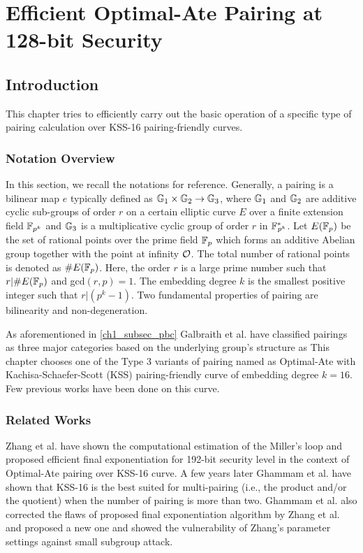 \chapter{Efficient Optimal-Ate Pairing at 128-bit Security} 
\label{ch:indocrypt}
\section{Introduction}
This chapter tries to efficiently carry out the basic operation of a specific type of pairing calculation over KSS-16 pairing-friendly curves. 

\subsection{Notation Overview}
In this section, we recall the notations for reference.
Generally, a pairing is a bilinear map $e$ typically defined as  ${\mathbb{G}}_{1} \times {\mathbb{G}}_{2} \to {\mathbb{G}}_{3}$, where ${\mathbb{G}}_{1}$ and ${\mathbb{G}}_{2}$ are additive cyclic sub-groups of  order $r$  on a certain elliptic curve $E$ over a finite extension field $\mathbb{F}_{p^k}$ and ${\mathbb{G}}_{3}$ is a multiplicative cyclic group of order $r$ in ${{\mathbb{F}}^{\ast}}_{\!\!\!p^{k}}$.
Let $E({\mathbb{F}}_{p})$ be the set of rational points over the prime field ${\mathbb{F}}_{p}$ which forms an additive Abelian group together with the point at infinity $\cal{O}$. The total number of rational points is denoted as $\#E({\mathbb{F}}_{p})$. Here, the order $r$ is a large prime number such that $r | \#E({\mathbb{F}}_{p})$ and gcd$(r,p)=1$. The embedding degree $k$ is the smallest positive integer such that $r | (p^k -1)$.
Two fundamental properties of pairing are bilinearity and non-degeneration.


As aforementioned in \ref{ch1_subsec_pbc} Galbraith et al. \cite{galbraith2008pairings} have classified pairings as three major categories based on the underlying group's structure as 
This chapter chooses one of the Type 3 variants of pairing named as Optimal-Ate \cite{DBLP:journals/tit/Vercauteren10} with Kachisa-Schaefer-Scott (KSS) \cite{EPRINT:KacSchSco07} pairing-friendly curve of embedding degree $k=16$. 
Few previous works have been done on this curve. 

\subsection{Related Works}
Zhang et al. \cite{INDOCRYPT:ZhaLin12} have shown the computational estimation of the Miller's loop and proposed efficient final exponentiation for 192-bit security level in the context of Optimal-Ate pairing over KSS-16 curve. 
A few years later Ghammam et al. \cite{EPRINT:GhaFou16b} have shown that KSS-16 is the best suited for multi-pairing (i.e., the product and/or the quotient) when the number of pairing is more than two. 
Ghammam et al. \cite{EPRINT:GhaFou16b} also corrected the flaws of proposed final exponentiation algorithm by Zhang et al. \cite{INDOCRYPT:ZhaLin12} and proposed a new one and showed the vulnerability of Zhang's parameter settings against small subgroup attack. 

